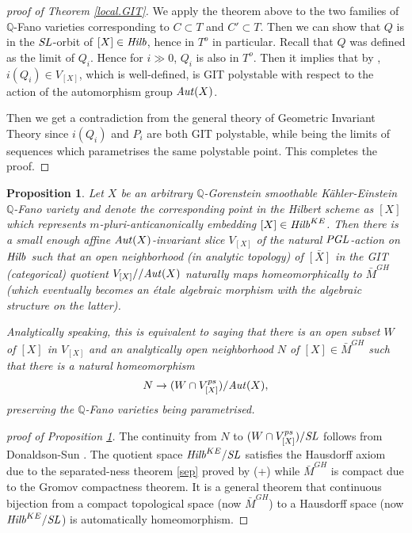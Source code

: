 \documentclass[12pt]{amsart}
\newtheorem{Prop}[Thm]{Proposition}
\theoremstyle{remark}
\theoremstyle{definition}
\begin{document}
\begin{proof}[proof of Theorem \ref{local.GIT}]
We apply the theorem above to the two families of $\mathbb{Q}$-Fano varieties 
corresponding to $C\subset T$ and $C'\subset T$. Then we can show that 
$Q$ is in the ${\it SL}$-orbit of $[X]\in {\it Hilb}$, hence in $T^{o}$ in 
particular. Recall that $Q$ was defined as the limit of $Q_{i}$. 
Hence for $i\gg 0$, $Q_{i}$ is also in $T^{o}$. 
Then it implies that by \cite[Lemma 3.6]{OSS}, 
$i(Q_{i})\in V_{[X]}$, which is well-defined, is GIT polystable 
with respect to the action of the automorphism group 
${\it Aut}(X)$. 

Then we get a contradiction from the general theory of Geometric Invariant 
Theory \cite{GIT} since $i(Q_{i})$ and $P_{i}$ are both 
GIT polystable, while being the limits of sequences which parametrises the 
same polystable point. This completes the proof. 
\end{proof}

\begin{Prop}\label{homeo}
Let $X$ be an arbitrary 
$\mathbb{Q}$-Gorenstein smoothable K\"ahler-Einstein $\mathbb{Q}$-Fano 
variety and denote the corresponding point in the Hilbert scheme 
as $[X]$ which represents 
$m$-pluri-anticanonically embedding $[X]\in {\it Hilb}^{KE}$. 
Then there is a small enough affine ${\it Aut}(X)$-invariant slice $V_{[X]}$ 
of the natural ${\it PGL}$-action on ${\it Hilb}$ such that 
an open neighborhood (in analytic topology) of $\bar{[X]}$ in 
the GIT (categorical) quotient $V_{[X]}//{\it Aut}(X)$ naturally maps 
homeomorphically to $\bar{M}^{GH}$ 
(which eventually becomes an 
\'etale algebraic morphism with the algebraic structure on the latter). 

Analytically speaking, this is equivalent to saying 
that there is an open subset $W$ of $[X]$ 
in $V_{[X]}$ and an analytically open neighborhood $N$ of $[X]\in \bar{M}^{GH}$ 
such that there is a natural homeomorphism 
$$N\rightarrow (W\cap V_{[X]}^{ps})/{\it Aut}(X),$$
preserving the $\mathbb{Q}$-Fano varieties being parametrised. 
\end{Prop}

\begin{proof}[proof of Proposition \ref{homeo}] 
The continuity from $N$ to $(W\cap V_{[X]}^{ps})/{\it SL}$ follows from 
Donaldson-Sun \cite[(proof of) Theorem 1.2]{DS}. The quotient space 
${\it Hilb}^{KE}/{\it SL}$ satisfies the Hausdorff axiom due to the 
separated-ness theorem \ref{sep} proved by (\cite{LWX}+\cite{SSY}) while 
$\bar M^{GH}$ is compact due to the Gromov compactness theorem. It is a general 
theorem that continuous bijection from a compact topological space 
(now $\bar M^{GH}$) to 
a Hausdorff space (now ${\it Hilb}^{KE}/{\it SL}$) is automatically 
homeomorphism. 
\end{proof}
\end{document}
